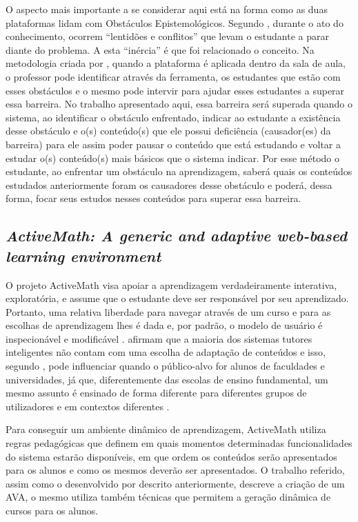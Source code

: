 O aspecto mais importante a se considerar aqui está na forma como as duas plataformas lidam com Obstáculos Epistemológicos. Segundo , durante o ato do conhecimento, 
ocorrem ``lentidões e conflitos'' que levam o estudante a parar diante do problema. A esta ``inércia'' é que foi relacionado o conceito. Na metodologia criada por , quando a 
plataforma é aplicada dentro da sala de aula, o professor pode identificar através da ferramenta, os estudantes que estão com esses obstáculos e o mesmo pode intervir para ajudar esses estudantes a 
superar essa barreira. No trabalho apresentado aqui, essa barreira será superada quando o sistema, ao identificar o obstáculo enfrentado, indicar ao estudante a exist\^encia desse obst\'aculo e o(s) 
conte\'udo(s) que ele possui defici\^encia (causador(es) da barreira) para ele assim poder pausar o conte\'udo que est\'a estudando e voltar a estudar o(s) conte\'udo(s) mais b\'asicos que o sistema 
indicar. Por esse método o  estudante, ao enfrentar um obst\'aculo na aprendizagem, saber\'a quais os conte\'udos estudados anteriormente foram os causadores desse obst\'aculo e poder\'a, dessa 
forma, focar seus estudos nesses conte\'udos para superar essa barreira.

\subsection{\textit{ActiveMath: A generic and adaptive web-based learning environment}}

O projeto ActiveMath visa apoiar a aprendizagem verdadeiramente interativa, exploratória, e assume que o estudante deve ser responsável por seu aprendizado. Portanto, uma relativa liberdade para 
navegar através de um curso e para as escolhas de aprendizagem lhes é dada e, por padrão, o modelo de usuário é inspecionável e modificável \cite{melis2001activemath}. 
 afirmam que a maioria dos sistemas tutores inteligentes não contam com uma escolha de adaptação de conteúdos e isso, segundo , pode 
influenciar quando o público-alvo for alunos de faculdades e universidades, já que, diferentemente das escolas de ensino fundamental,  um mesmo assunto é ensinado de forma diferente para diferentes 
grupos de utilizadores e em contextos diferentes \cite{melis2001activemath}.

Para conseguir um ambiente dinâmico de aprendizagem, ActiveMath utiliza regras pedagógicas que definem em quais momentos determinadas funcionalidades do sistema estarão disponíveis, em que ordem os 
conteúdos serão apresentados para os alunos e como os mesmos deverão ser apresentados. O trabalho referido,  assim como o desenvolvido por  descrito anteriormente, descreve a 
criação de um AVA, o mesmo utiliza tamb\'em técnicas que permitem a geração dinâmica de cursos para os alunos.

